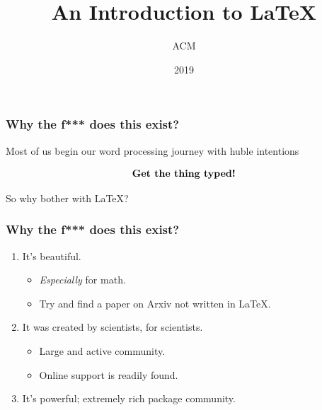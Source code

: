 \documentclass{beamer}
\title{An Introduction to \LaTeX}
\author{ACM}
\institute{New York University}
\date{2019}
\begin{document}
 
\frame{\titlepage}
 

\begin{frame}
\frametitle{Why the f*** does this exist?}
Most of us begin our word processing journey with huble intentions

\[
\text{\textbf{Get the thing typed!}}
\]

So why bother with \LaTeX\@?

\end{frame}


\begin{frame}
\frametitle{Why the f*** does this exist?}

\begin{enumerate}

    \item It's beautiful.

        \begin{itemize}
            \item \textit{Especially} for math.
            \item Try and find a paper on Arxiv not written in \LaTeX.
        \end{itemize}

    \item It was created by scientists, for scientists.

        \begin{itemize}
            \item Large and active community.
            \item Online support is readily found.
        \end{itemize}

    \item It's powerful; extremely rich package community.

\end{enumerate}

\end{frame}
\end{document}
